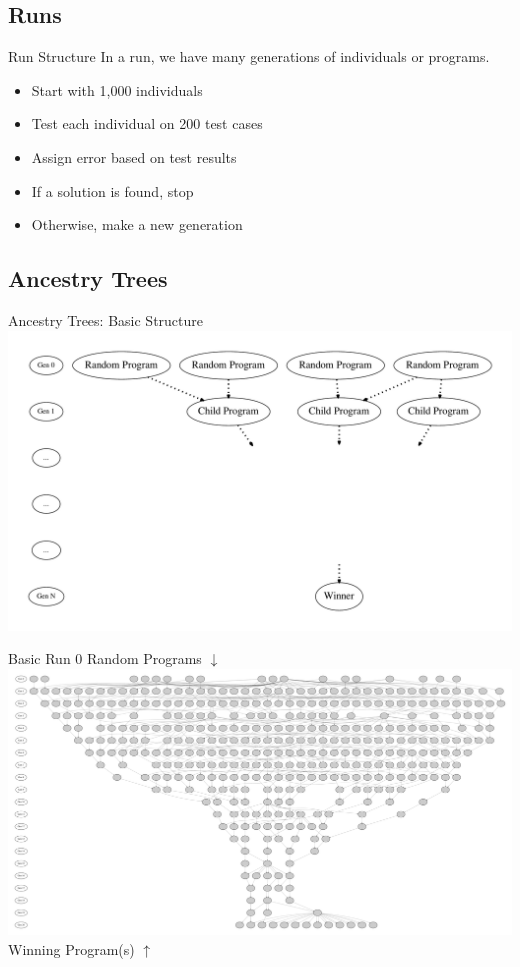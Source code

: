 \documentclass{beamer}
\begin{document}
\subsection[Runs]{Runs}
\begin{frame}{Run Structure}
In a run, we have many generations of individuals or programs.
\begin{itemize}
\item Start with 1,000 individuals
\item Test each individual on 200 test cases
\item Assign error based on test results
\item If a solution is found, stop
\item Otherwise, make a new generation
\end{itemize} 
\end{frame}

\subsection[Ancestry Trees]{Ancestry Trees}
\begin{frame}{Ancestry Trees: Basic Structure}
\center \includegraphics[width=\textwidth]{Illustrations/generic_run.pdf} 
\end{frame}

\begin{frame}{Basic Run 0}
\center Random Programs $\downarrow$ \\
\includegraphics[width=\textwidth]{Illustrations/run0_basic_structure.pdf} \\
Winning Program(s) $\uparrow$ 
\end{frame}
\end{document}

